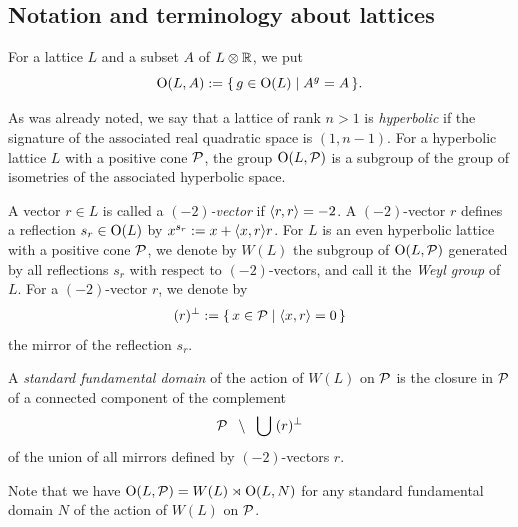 \documentclass{amsart} %
\begin{document}
\subsection{Notation and terminology about lattices}\label{subsec:notationlat}
%
For a lattice $L$ and a subset $A$ of $L\otimes \mathord{\mathbb{R}}$,
we put
\[
\mathord{\mathrm{O}}(L, A):=\{\,{g\in \mathord{\mathrm{O}}(L)}\mid {A^g=A} \,\}.
\]
\par
As was already noted,
we say that a lattice of rank $n>1$ is \emph{hyperbolic}
if the signature of the associated real quadratic space is $(1, n-1)$.
For   a hyperbolic lattice $L$  with a positive cone $\mathord{\mathcal{P}}$,
the group
$\mathord{\mathrm{O}}(L, \mathord{\mathcal{P}})$ is a subgroup of the group of isometries of the associated hyperbolic space.
\par %
A vector $r\in L$ is called a \emph{$(-2)$-vector} if $\langle r, r \rangle=-2$.
A $(-2)$-vector $r$ defines  a reflection 
$s_r\in \mathord{\mathrm{O}}(L)$ by $x^{s_r}:=x+\langle x, r \rangle r$.
For $L$ is an even  hyperbolic lattice with a positive cone $\mathord{\mathcal{P}}$,
we denote by $W(L)$ the subgroup of $\mathord{\mathrm{O}}(L, \mathord{\mathcal{P}})$
generated by all reflections $s_r$ with respect to $(-2)$-vectors,
and call it the \emph{Weyl group} of $L$.
For a  $(-2)$-vector $r$,
we denote by
\[
(r)^{\perp}:=\{\,{x\in \mathord{\mathcal{P}}}\mid {\langle x, r \rangle=0} \,\}
\]
the mirror of the reflection $s_r$.
%
\begin{definition}
A \emph{standard fundamental domain} of the action of $W(L)$ on $\mathord{\mathcal{P}}$
is the  closure in $ \mathord{\mathcal{P}}$ of a connected component of the complement 
\[
\mathord{\mathcal{P}}\;\;\setminus \;\;\bigcup\; (r)^{\perp}
\]
of the union of all mirrors defined by  $(-2)$-vectors $r$.
\end{definition}
%
Note that  we have $\mathord{\mathrm{O}}(L, \mathord{\mathcal{P}})=W(L)\rtimes \mathord{\mathrm{O}}(L, N)$
for any standard fundamental domain $N$ of the action of $W(L)$ on $\mathord{\mathcal{P}}$.
%
\end{document}
